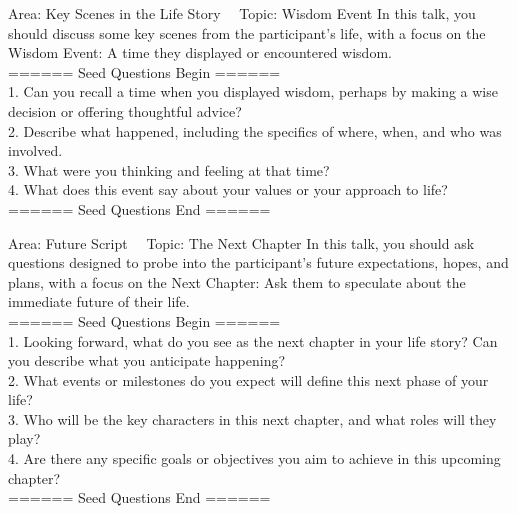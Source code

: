 \begin{mybox}{Area: Key Scenes in the Life Story \ \ Topic: Wisdom Event}
In this talk, you should discuss some key scenes from the participant's life, with a focus on the Wisdom Event: A time they displayed or encountered wisdom. \\
====== Seed Questions Begin ====== \\
1. Can you recall a time when you displayed wisdom, perhaps by making a wise decision or offering thoughtful advice? \\
2. Describe what happened, including the specifics of where, when, and who was involved. \\
3. What were you thinking and feeling at that time? \\
4. What does this event say about your values or your approach to life? \\
====== Seed Questions End ====== \\
\end{mybox}

\begin{mybox}{Area: Future Script \ \ Topic: The Next Chapter}
In this talk, you should ask questions designed to probe into the participant’s future expectations, hopes, and plans, with a focus on the Next Chapter: Ask them to speculate about the immediate future of their life. \\
====== Seed Questions Begin ====== \\
1. Looking forward, what do you see as the next chapter in your life story? Can you describe what you anticipate happening? \\
2. What events or milestones do you expect will define this next phase of your life? \\
3. Who will be the key characters in this next chapter, and what roles will they play? \\
4. Are there any specific goals or objectives you aim to achieve in this upcoming chapter? \\
====== Seed Questions End ====== \\
\end{mybox}


